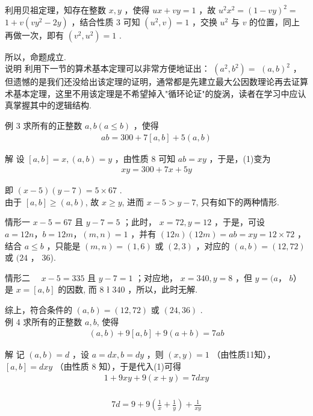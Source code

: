 利用贝祖定理，知存在整数 $x ,  y$ ，使得 $u x+v y=1$ ，故 $u^{2} x^{2}=(1-v y)^{2}=$ $1+v\left(v y^{2}-2 y\right)$ ，结合性质 3 可知 $\left(u^{2}, v\right)=1$ ，交换 $u^{2}$ 与 $v$ 的位置，同上再做一次，即有 $\left(v^{2}, u^{2}\right)=1$ . 

所以，命题成立. \\
说明 利用下一节的算术基本定理可以非常方便地证出： $\left(a^{2}, b^{2}\right)=$ $(a, b)^{2}$ ，但遗憾的是我们还没给出该定理的证明，通常都是先建立最大公因数理论再去证算术基本定理，这里不用该定理是不希望掉入"循环论证"的旋涡，读者在学习中应认真掌握其中的逻辑结构. 

例 3 求所有的正整数 $a ,  b(a \leqslant b)$ ，使得\\
\begin{align*}
a b=300+7[a, b]+5(a, b)
\end{align*}

解 设 $[a, b]=x,(a, b)=y$ ，由性质 8 可知 $a b=x y$ ，于是，(1)变为\\
\begin{align*}
x y=300+7 x+5 y
\end{align*}

即 $(x-5)(y-7)=5 \times 67$ . \\
由于 $[a, b] \geqslant(a, b)$, 故 $x \geqslant y$, 进而 $x-5>y-7$, 只有如下的两种情形. 

情形一 $x-5=67$ 且 $y-7=5$ ；此时， $x=72, y=12$ ，于是，可设 $a=12 n ， b=12 m ，(m, n)=1$ ，并有 $(12 n)(12 m)=a b=x y=12 \times 72$ ，结合 $a \leqslant b$ ，只能是 $(m, n)=(1,6)$ 或 $(2,3)$ ，对应的 $(a, b)=(12,72)$ 或 $(24$ ， 36).

情形二 $\quad x-5=335$ 且 $y-7=1$ ；对应地， $x=340, y=8$ ，但 $y=(a ，$ $b ）$ 是 $x=[a, b]$ 的因数, 而 8 ł 340 ，所以，此时无解. 

综上，符合条件的 $(a, b)=(12,72)$ 或 $(24,36)$ . \\
例 4 求所有的正整数 $a ,  b$, 使得\\
\begin{align*}
(a, b)+9[a, b]+9(a+b)=7 a b
\end{align*}

解 记 $(a, b)=d$ ，设 $a=d x, b=d y$ ，则 $(x, y)=1$ （由性质11知）， $[a, b]=d x y$ （由性质 8 知），于是代入(1)可得\\
\begin{align*}
1+9 x y+9(x+y)=7 d x y
\end{align*}\\
\begin{align*}
7 d=9+9\left(\frac{1}{x}+\frac{1}{y}\right)+\frac{1}{x y}
\end{align*}

